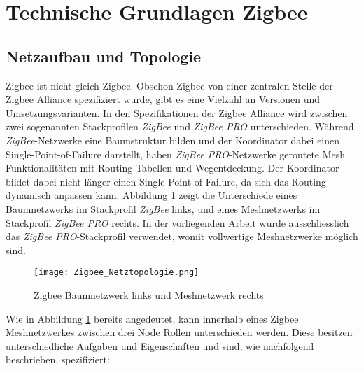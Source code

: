 \clearpage
\section{Technische Grundlagen Zigbee}\label{sec:TechnischeGrundlagenZigbee}

\subsection{Netzaufbau und Topologie}\label{subsec:ZigbeeNetzaufbauundTopologie}
Zigbee ist nicht gleich Zigbee.
Obschon Zigbee von einer zentralen Stelle der Zigbee Alliance spezifiziert wurde, gibt es eine Vielzahl an Versionen und Umsetzungsvarianten.
In den Spezifikationen der Zigbee Alliance wird zwischen zwei sogenannten Stackprofilen \textit{ZigBee} und \textit{ZigBee PRO} unterschieden.
Während \textit{ZigBee}-Netzwerke eine Baumstruktur bilden und der Koordinator dabei einen Single-Point-of-Failure darstellt, haben \textit{ZigBee PRO}-Netzwerke geroutete Mesh Funktionalitäten mit Routing Tabellen und Wegentdeckung.
Der Koordinator bildet dabei nicht länger einen Single-Point-of-Failure, da sich das Routing dynamisch anpassen kann.
Abbildung \ref{fig:NetzwerktopologienZigbee} zeigt die Unterschiede eines Baumnetzwerks im Stackprofil \textit{ZigBee} links, und eines Meshnetzwerks im Stackprofil \textit{ZigBee PRO} rechts.
In der vorliegenden Arbeit wurde ausschliesslich das \textit{ZigBee PRO}-Stackprofil verwendet, womit vollwertige Meshnetzwerke möglich sind.

\begin{figure}[h]
	\centering
	\texttt{[image: Zigbee\_Netztopologie.png]}
	\caption{Zigbee Baumnetzwerk links und Meshnetzwerk rechts \cite[S.~221]{markus_krause_rainer_konrad_zigbee_2014}}	\label{fig:NetzwerktopologienZigbee}
\end{figure}

Wie in Abbildung \ref{fig:NetzwerktopologienZigbee} bereits angedeutet, kann innerhalb eines Zigbee Meshnetzwerkes zwischen drei Node Rollen unterschieden werden. Diese besitzen unterschiedliche Aufgaben und Eigenschaften und sind, wie nachfolgend beschrieben, spezifiziert:

